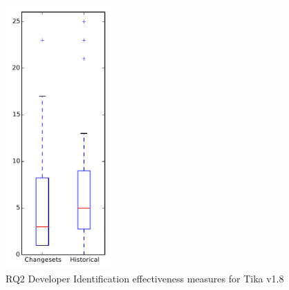 
\begin{figure}[t]
\centering
\includegraphics[width=0.36\textwidth]{figures/dit/rq2_tika}
\caption{RQ2 Developer Identification effectiveness measures for Tika v1.8}
\label{fig:dit:rq2:tika}
\end{figure}
